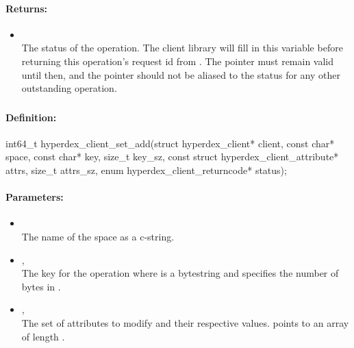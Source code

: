 \paragraph{Returns:}
\begin{itemize}[noitemsep]
\item {}\\
The status of the operation.  The client library will fill in this variable before returning this operation's request id from .  The pointer must remain valid until then, and the pointer should not be aliased to the status for any other outstanding operation.
\end{itemize}

\pagebreak
\subsubsection{}
\label{api:c:set_add}


\paragraph{Definition:}
\begin{ccode}
int64_t hyperdex_client_set_add(struct hyperdex_client* client,
        const char* space,
        const char* key, size_t key_sz,
        const struct hyperdex_client_attribute* attrs, size_t attrs_sz,
        enum hyperdex_client_returncode* status);
\end{ccode}

\paragraph{Parameters:}
\begin{itemize}[noitemsep]
\item {}\\
The name of the space as a c-string.
\item {}, \\
The key for the operation where  is a bytestring and  specifies the number of bytes in .
\item {}, \\
The set of attributes to modify and their respective values.   points to an array of length .
\end{itemize}

